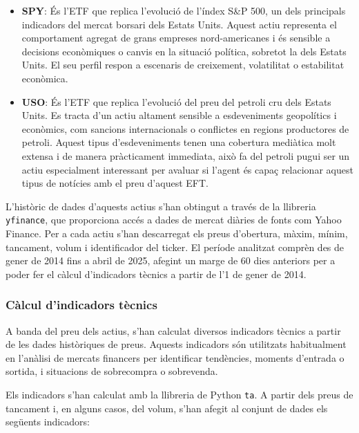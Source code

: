 \documentclass[12pt,a4paper,twoside]{book}
\begin{document}
\begin{itemize}
    \item \textbf{SPY}: És l'ETF que replica l'evolució de l'índex S\&P 500, un dels principals indicadors del mercat borsari dels Estats Units. Aquest actiu representa el comportament agregat de grans empreses nord-americanes i és sensible a decisions econòmiques o canvis en la situació política, sobretot la dels Estats Units. El seu perfil respon a escenaris de creixement, volatilitat o estabilitat econòmica.

    \item \textbf{USO}: És l'ETF que replica l'evolució del preu del petroli cru dels Estats Units. Es tracta d'un actiu altament sensible a esdeveniments geopolítics i econòmics, com sancions internacionals o conflictes en regions productores de petroli. Aquest tipus d'esdeveniments tenen una cobertura mediàtica molt extensa i de manera pràcticament immediata, això fa del petroli pugui ser un actiu especialment interessant per avaluar si l'agent és capaç relacionar aquest tipus de notícies amb el preu d'aquest EFT.

\end{itemize}

L'històric de dades d'aquests actius s'han obtingut a través de la llibreria \texttt{yfinance}, que proporciona accés a dades de mercat diàries de fonts com Yahoo Finance. Per a cada actiu s'han descarregat els preus d'obertura, màxim, mínim, tancament, volum i identificador del ticker. El període analitzat comprèn des de gener de 2014 fins a abril de 2025, afegint un marge de 60 dies anteriors per a poder fer el càlcul d'indicadors tècnics a partir de l'1 de gener de 2014.

\subsubsection*{Càlcul d'indicadors tècnics}

A banda del preu dels actius, s'han calculat diversos indicadors tècnics a partir de les dades històriques de preus. Aquests indicadors són utilitzats habitualment en l'anàlisi de mercats financers per identificar tendències, moments d'entrada o sortida, i situacions de sobrecompra o sobrevenda.

Els indicadors s'han calculat amb la llibreria de Python \texttt{ta}. A partir dels preus de tancament i, en alguns casos, del volum, s'han afegit al conjunt de dades els següents indicadors:
\end{document}
